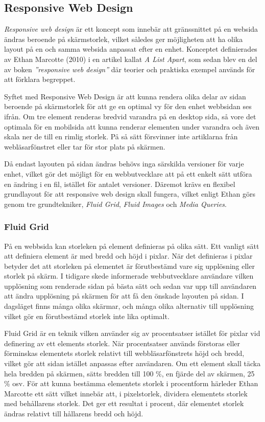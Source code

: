 \documentclass[11pt]{article}
\begin{document}
\subsection{Responsive Web Design}

\textit{Responsive web design} är ett koncept som innebär att gränssnittet på en websida ändras beroende på skärmstorlek, vilket således ger möjligheten att ha olika layout på en och samma websida anpassat efter en enhet. Konceptet definierades av Ethan Marcotte (2010) i en artikel kallat \textit{A List Apart}, som sedan blev en del av boken \textit{”responsive web design”} där teorier och praktiska exempel används för att förklara begreppet. 

Syftet med Responsive Web Design är att kunna rendera olika delar av sidan beroende på skärmstorlek för att ge en optimal vy för den enhet webbsidan ses ifrån. Om tre element renderas bredvid varandra på en desktop sida, så vore det optimala för en mobilsida att kunna renderar elementen under varandra och även skala ner de till en rimlig storlek. På så sätt försvinner inte artiklarna från webläsarfönstret eller tar för stor plats på skärmen.

Då endast layouten på sidan ändras behövs inga särskilda versioner för varje enhet, vilket gör det möjligt för en webbutvecklare att på ett enkelt sätt utföra en ändring i en fil, istället för antalet versioner. Däremot krävs en flexibel grundlayout för att responsive web design skall fungera, vilket enligt Ethan görs genom tre grundtekniker, \textit{Fluid Grid}, \textit{Fluid Images} och \textit{Media Queries}.

\subsubsection{Fluid Grid}
På en webbsida kan storleken på element definieras på olika sätt. Ett vanligt sätt att definiera element är med bredd och höjd i pixlar. När det definieras i pixlar betyder det att storleken på elementet är förutbestämd vare sig upplösning eller storlek på skärm. I tidigare skede informerade webbutvecklare användare vilken upplösning som renderade sidan på bästa sätt och sedan var upp till användaren att ändra upplösning på skärmen för att få den önskade layouten på sidan. I dagsläget finns många olika skärmar, och många olika alternativ till upplösning vilket gör en förutbestämd storlek inte lika optimalt. 

Fluid Grid är en teknik vilken använder sig av procentsatser istället för pixlar vid definering av ett elements storlek. När procentsatser används förstoras eller förminskas elementets storlek relativt till webbläsarfönstrets höjd och bredd, vilket gör att sidan istället anpassas efter användaren. Om ett element skall täcka hela bredden på skärmen, sätts bredden till 100 \%, en fjärde del av skärmen, 25 \% osv. 
För att kunna bestämma elementets storlek i procentform härleder Ethan Marcotte ett sätt vilket innebär att, i pixelstorlek, dividera elementets storlek med behållarens storlek. Det ger ett resultat i procent, där elementet storlek ändras relativt till hållarens bredd och höjd.
\end{document}
